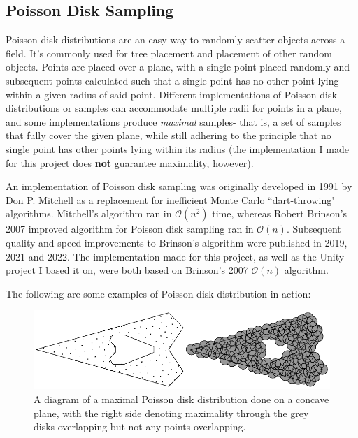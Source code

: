 \subsection{Poisson Disk Sampling}

Poisson disk distributions are an easy way to randomly scatter objects across a field. It's commonly used for tree placement and placement of other random objects. Points are placed over a plane, with a single point placed randomly and subsequent points calculated such that a single point has no other point lying within a given radius of said point. Different implementations of Poisson disk distributions or samples can accommodate multiple radii for points in a plane, and some implementations produce \textit{maximal} samples- that is, a set of samples that fully cover the given plane, while still adhering to the principle that no single point has other points lying within its radius\cite{10.1145/1964921.1964944} (the implementation I made for this project does \textbf{not} guarantee maximality, however).

An implementation of Poisson disk sampling was originally developed in 1991 by Don P. Mitchell\cite{10.1145/127719.122736} as a replacement for inefficient Monte Carlo ``dart-throwing" algorithms.\cite{pdshistory} Mitchell's algorithm ran in $\mathcal{O}(n^{2})$ time, whereas Robert Brinson's 2007 improved algorithm for Poisson disk sampling\cite{10.1145/1278780.1278807} ran in $\mathcal{O}(n)$. Subsequent quality and speed improvements to Brinson's algorithm were published in 2019\cite{pdsimprovementroberts}, 2021\cite{pdshistory} and 2022\cite{pdsimprovementrus}. The implementation made for this project, as well as the Unity project I based it on, were both based on Brinson's 2007 $\mathcal{O}(n)$ algorithm.\cite{seblaguetuteGH}\cite{seblaguetuteYT}

The following are some examples of Poisson disk distribution in action:

\begin{figure}[H]
    \centering
    \includegraphics[width=\textwidth]{Images/maximalpoissonsample.png}
    \caption{A diagram of a maximal Poisson disk distribution done on a concave plane, with the right side denoting maximality through the grey disks overlapping but not any points overlapping.\cite{10.1145/1964921.1964944}}
    \label{fig:maximalpoisson}
\end{figure}


